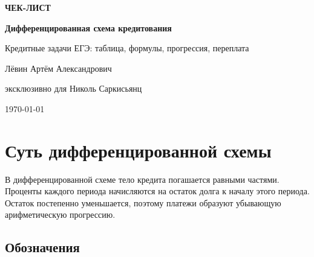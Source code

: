\documentclass[a4paper,12pt]{article}
\begin{document}
\begin{titlepage}
  \thispagestyle{empty}
  \centering
  \vspace*{2.6cm}

  {\Large\bfseries\color{accent} ЧЕК-ЛИСТ\par}
  \vspace{0.8cm}

  {\Huge\bfseries\color{darkaccent}
  Дифференцированная схема кредитования\par}

  \vspace{0.55cm}

  {\Large
  Кредитные задачи ЕГЭ: таблица, формулы, прогрессия, переплата\par}

  \vspace{2.2cm}

  {\large Лёвин Артём Александрович\par}
  \vspace{0.25cm}
  {\large эксклюзивно для Николь Саркисьянц\par}

  \vfill

  {\large \today\par}
  \vspace{1.3cm}


  \vspace*{0.7cm}
\end{titlepage}

\section{Суть дифференцированной схемы}

В дифференцированной схеме тело кредита погашается равными частями.
Проценты каждого периода начисляются на остаток долга к началу этого
периода. Остаток постепенно уменьшается, поэтому платежи образуют
убывающую арифметическую прогрессию.

\subsection{Обозначения}
\end{document}
